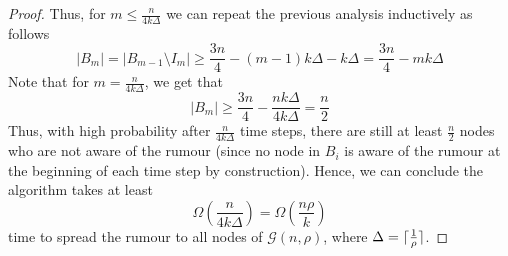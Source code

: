 \begin{proof}
	Thus, for $m \leq \frac{n}{4k\Delta}$ we can repeat the previous analysis inductively as follows %
	$$
		|B_m| = |B_{m-1} \setminus I_m| \geq \frac{3n}{4} - (m-1)k\Delta - k\Delta = \frac{3n}{4} - mk\Delta
	$$
	Note that for $m = \frac{n}{4k\Delta}$, we get that 
	$$
		|B_m| \geq \frac{3n}{4} - \frac{nk\Delta}{4k\Delta} = \frac{n}{2}
	$$
	Thus, with high probability after $\frac{n}{4k\Delta}$ time steps, there are still at least $\frac{n}{2}$ nodes who are not aware of the rumour (since no node in $B_i$ is aware of the rumour at the beginning of each time step by construction). Hence, we can conclude the algorithm takes at least 
	$$
		\Omega\left(\frac{n}{4k\Delta}\right) = \Omega\left(\frac{n\rho}{k}\right)
	$$
	time to spread the rumour to all nodes of $\mathcal{G}(n, \rho)$, where $\Delta = \lceil\frac{1}{\rho}\rceil$.
\end{proof}